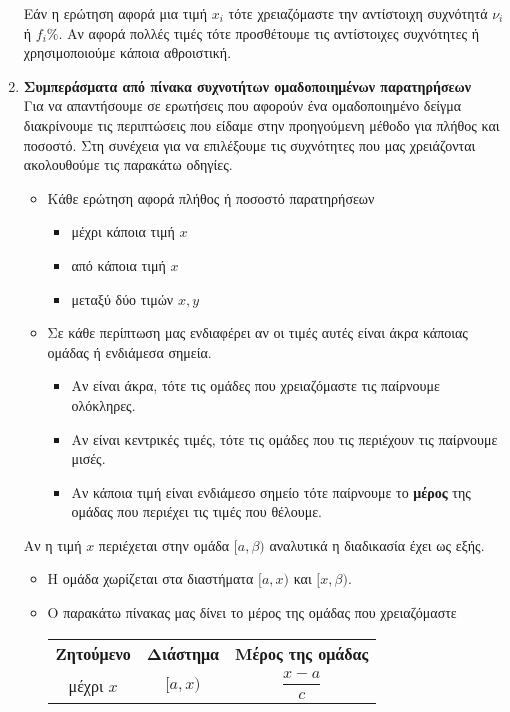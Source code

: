 \documentclass[a4paper,11pt]{article}
\begin{document}
\begin{enumerate}[label=\bf\thesection.\arabic*.]
\begin{itemize}
\end{itemize}
Εάν η ερώτηση αφορά μια τιμή $ x_i $ τότε χρειαζόμαστε την αντίστοιχη συχνότητά $ \nu_i $ ή $ f_i\% $. Αν αφορά πολλές τιμές τότε προσθέτουμε τις αντίστοιχες συχνότητες ή χρησιμοποιούμε κάποια αθροιστική.
\item \textbf{Συμπεράσματα από πίνακα συχνοτήτων ομαδοποιημένων παρατηρήσεων}\\
Για να απαντήσουμε σε ερωτήσεις που αφορούν ένα ομαδοποιημένο δείγμα διακρίνουμε τις περιπτώσεις που είδαμε στην προηγούμενη μέθοδο για πλήθος και ποσοστό. Στη συνέχεια για να επιλέξουμε τις συχνότητες που μας χρειάζονται ακολουθούμε τις παρακάτω οδηγίες.
\begin{itemize}
\item Κάθε ερώτηση αφορά πλήθος ή ποσοστό παρατηρήσεων
\begin{itemize}
\item μέχρι κάποια τιμή $ x $
\item από κάποια τιμή $ x $
\item μεταξύ δύο τιμών $ x,y $
\end{itemize}
\item Σε κάθε περίπτωση μας ενδιαφέρει αν οι τιμές αυτές είναι άκρα κάποιας ομάδας ή ενδιάμεσα σημεία.
\begin{itemize}
\item Αν είναι άκρα, τότε τις ομάδες που χρειαζόμαστε τις παίρνουμε ολόκληρες.
\item Αν είναι κεντρικές τιμές, τότε τις ομάδες που τις περιέχουν τις παίρνουμε μισές.
\item Αν κάποια τιμή είναι ενδιάμεσο σημείο τότε παίρνουμε το \textbf{μέρος} της ομάδας που περιέχει τις τιμές που θέλουμε.
\end{itemize}
\end{itemize}
Αν η τιμή $ x $ περιέχεται στην ομάδα $ [a,\beta) $ αναλυτικά η διαδικασία έχει ως εξής.
\begin{itemize}
\item Η ομάδα χωρίζεται στα διαστήματα $ [a,x) $ και $ [x,\beta) $.
\item Ο παρακάτω πίνακας μας δίνει το μέρος της ομάδας που χρειαζόμαστε
\begin{center}
\begin{tabular}{c|cc}
\hline
\rule[-2ex]{0pt}{5.5ex} \textbf{Ζητούμενο} & \textbf{Διάστημα} & \textbf{Μέρος της ομάδας} \\
\hhline{===}
\rule[-2ex]{0pt}{5.5ex} μέχρι $ x $ & $ [a,x) $ & $ \dfrac{x-a}{c} $ \\[2mm]

\end{tabular}
\end{center}
\end{itemize}
\end{enumerate}
\end{document}
